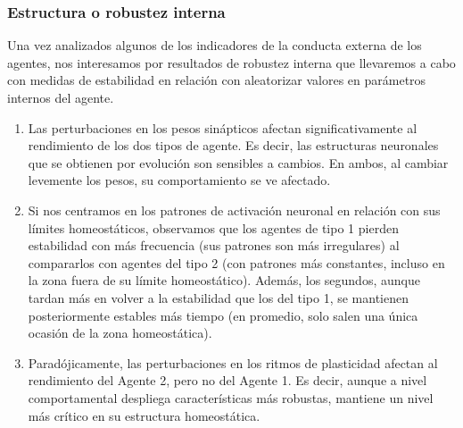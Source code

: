 \subsubsection{Estructura o robustez interna}
Una vez analizados algunos de los indicadores de la conducta externa de los agentes, nos interesamos por resultados de robustez interna que llevaremos a cabo con medidas de estabilidad en relación con aleatorizar valores en parámetros internos del agente.
\begin{enumerate}
  \item {Las perturbaciones en los pesos sinápticos afectan significativamente al rendimiento de los dos tipos de agente. Es decir, las estructuras neuronales que se obtienen por evolución son sensibles a cambios. En ambos, al cambiar levemente los pesos, su comportamiento se ve afectado.}
  \item {Si nos centramos en los patrones de activación neuronal en relación con sus límites homeostáticos, observamos que los agentes de tipo 1 pierden estabilidad con más frecuencia (sus patrones son más irregulares) al compararlos con agentes del tipo 2 (con patrones más constantes, incluso en la zona fuera de su límite homeostático). Además, los segundos, aunque tardan más en volver a la estabilidad que los del tipo 1, se mantienen posteriormente estables más tiempo (en promedio, solo salen una única ocasión de la zona homeostática).}
  \item {Paradójicamente, las perturbaciones en los ritmos de plasticidad afectan al rendimiento del Agente 2, pero no del Agente 1. Es decir, aunque a nivel comportamental despliega características más robustas, mantiene un nivel más crítico en su estructura homeostática.}
\end{enumerate}

